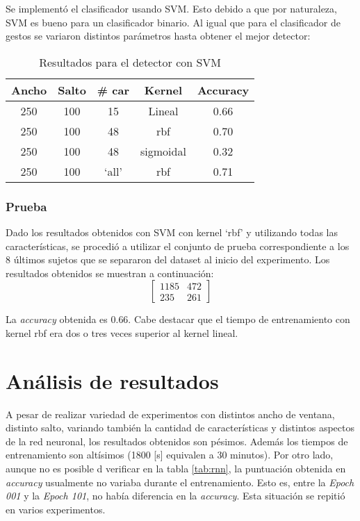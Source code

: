 \par Se implementó el clasificador usando SVM. Esto debido a que por naturaleza, SVM es bueno para un clasificador binario. Al igual que para el clasificador de gestos se variaron distintos parámetros hasta obtener el mejor detector:

\begin{table}[H]
\centering
\begin{tabular}{|c|c|c|c|c|}
\hline
\textbf{Ancho} & \textbf{Salto} & \textbf{\# car} &\textbf{Kernel} & \textbf{Accuracy}   \\ \hline
250     & 100 &  15     & Lineal     & 0.66   \\ \hline
250     & 100   & 48    & rbf  & 0.70   \\ \hline
250     & 100   & 48    & sigmoidal  & 0.32   \\ \hline
250     & 100   & `all'    & rbf  & 0.71   \\ \hline
\end{tabular}
\caption{Resultados para el detector con SVM}
\label{tab:svm}
\end{table}

\subsubsection*{Prueba}
\par Dado los resultados obtenidos con SVM con kernel `rbf' y utilizando todas las características, se procedió a utilizar el conjunto de prueba correspondiente a los 8 últimos sujetos que se separaron del dataset al inicio del experimento. Los resultados obtenidos se muestran a continuación:
\begin{equation*}
    \begin{bmatrix}
        1185 & 472\\ 
        235 & 261
    \end{bmatrix}    
\end{equation*}


\par La \textit{accuracy} obtenida es 0.66. Cabe destacar que el tiempo de entrenamiento con kernel rbf era dos o tres veces superior al kernel lineal. 


\newpage
\section{Análisis de resultados}
\par A pesar de realizar variedad de experimentos con distintos ancho de ventana, distinto salto, variando también la cantidad de características y distintos aspectos de la red neuronal, los resultados obtenidos son pésimos. Además los tiempos de entrenamiento son altísimos (1800 [s] equivalen a 30 minutos). Por otro lado, aunque no es posible d verificar en la tabla \ref{tab:rnn}, la puntuación obtenida en \textit{accuracy} usualmente no variaba durante el entrenamiento. Esto es, entre la \textit{Epoch 001} y la \textit{Epoch 101}, no había diferencia en la \textit{accuracy}. Esta situación se repitió en varios experimentos. 

